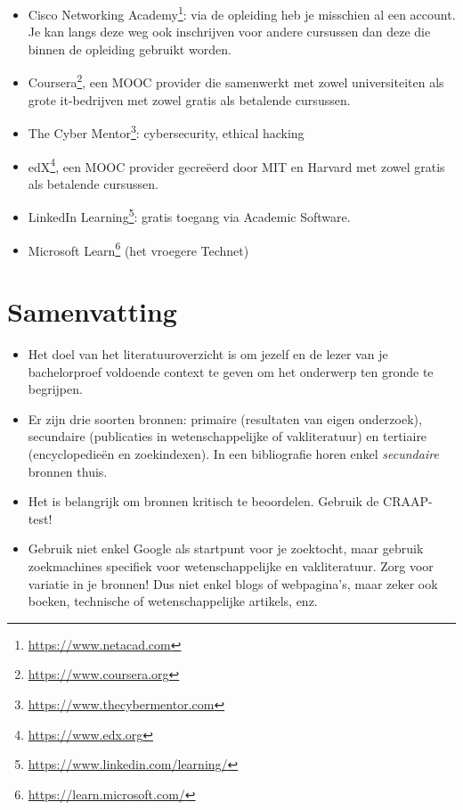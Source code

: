 \begin{itemize}
  \item Cisco Networking Academy\footnote{\url{https://www.netacad.com}}: via de opleiding heb je misschien al een account. Je kan langs deze weg ook inschrijven voor andere cursussen dan deze die binnen de opleiding gebruikt worden.
  \item Coursera\footnote{\url{https://www.coursera.org}}, een MOOC provider die samenwerkt met zowel universiteiten als grote it-bedrijven met zowel gratis als betalende cursussen.
  \item The Cyber Mentor\footnote{\url{https://www.thecybermentor.com}}: cybersecurity, ethical hacking
  \item edX\footnote{\url{https://www.edx.org}}, een MOOC provider gecreëerd door MIT en Harvard met zowel gratis als betalende cursussen.
  \item LinkedIn Learning\footnote{\url{https://www.linkedin.com/learning/}}: gratis toegang via Academic Software.
  \item Microsoft Learn\footnote{\url{https://learn.microsoft.com/}} (het vroegere Technet)
\end{itemize}


\section{Samenvatting}%
\label{sec:literatuuroverzicht_samenvatting}

\begin{itemize}
  \item Het doel van het literatuuroverzicht is om jezelf en de lezer van je bachelorproef voldoende context te geven om het onderwerp ten gronde te begrijpen.
  \item Er zijn drie soorten bronnen: primaire (resultaten van eigen onderzoek), secundaire (publicaties in wetenschappelijke of vakliteratuur) en tertiaire (encyclopedieën en zoekindexen). In een bibliografie horen enkel \emph{secundaire} bronnen thuis.
  \item Het is belangrijk om bronnen kritisch te beoordelen. Gebruik de CRAAP-test!
  \item Gebruik niet enkel Google als startpunt voor je zoektocht, maar gebruik zoekmachines specifiek voor wetenschappelijke en vakliteratuur. Zorg voor variatie in je bronnen! Dus niet enkel blogs of webpagina's, maar zeker ook boeken, technische of wetenschappelijke artikels, enz.
\end{itemize}


